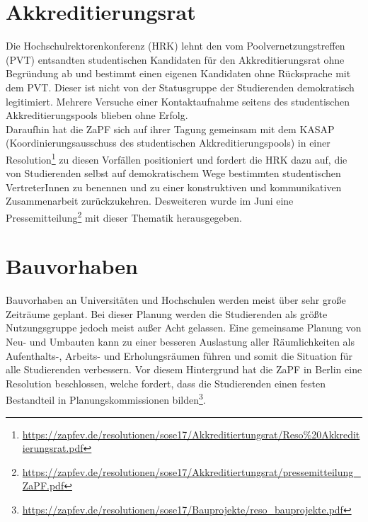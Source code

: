 \documentclass[a4paper]{article}
\begin{document}
\section*{Akkreditierungsrat}
Die Hochschulrektorenkonferenz (HRK) lehnt den vom Poolvernetzungstreffen (PVT) entsandten studentischen Kandidaten für den Akkreditierungsrat ohne Begründung ab und bestimmt einen eigenen Kandidaten ohne Rücksprache mit dem PVT. Dieser ist nicht von der Statusgruppe der Studierenden demokratisch legitimiert. Mehrere Versuche einer Kontaktaufnahme seitens des studentischen Akkreditierungspools blieben ohne Erfolg.\\
Daraufhin hat die ZaPF sich auf ihrer Tagung gemeinsam mit dem KASAP (Koordinierungsausschuss des studentischen Akkreditierungspools) in einer Resolution\footnote{\href{https://zapfev.de/resolutionen/sose17/Akkreditiertungsrat/Reso\%20Akkreditierungsrat.pdf} {\url{https://zapfev.de/resolutionen/sose17/Akkreditiertungsrat/Reso\%20Akkreditierungsrat.pdf}}} zu diesen Vorfällen positioniert und fordert die HRK dazu auf, die von Studierenden selbst auf demokratischem Wege bestimmten studentischen VertreterInnen zu benennen und zu einer konstruktiven und kommunikativen Zusammenarbeit zurückzukehren. Desweiteren wurde im Juni eine Pressemitteilung\footnote{\href{https://zapfev.de/resolutionen/sose17/Akkreditiertungsrat/pressemitteilung_ZaPF.pdf} {\url{https://zapfev.de/resolutionen/sose17/Akkreditiertungsrat/pressemitteilung\_ZaPF.pdf}}} mit dieser Thematik herausgegeben. 


\section*{Bauvorhaben}
Bauvorhaben an Universitäten und Hochschulen werden meist über sehr große Zeiträume geplant. Bei dieser Planung werden die Studierenden als größte Nutzungsgruppe jedoch meist außer Acht gelassen.
Eine gemeinsame Planung von Neu- und Umbauten kann zu einer besseren Auslastung aller Räumlichkeiten als Aufenthalts-, Arbeits- und Erholungsräumen führen und somit die Situation für alle Studierenden verbessern. Vor diesem Hintergrund hat die ZaPF in Berlin eine Resolution beschlossen, welche fordert, dass die Studierenden einen festen Bestandteil in Planungskommissionen bilden\footnote{\href{https://zapfev.de/resolutionen/sose17/Bauprojekte/reso_bauprojekte.pdf}{\url{https://zapfev.de/resolutionen/sose17/Bauprojekte/reso_bauprojekte.pdf}}}.
\end{document}
